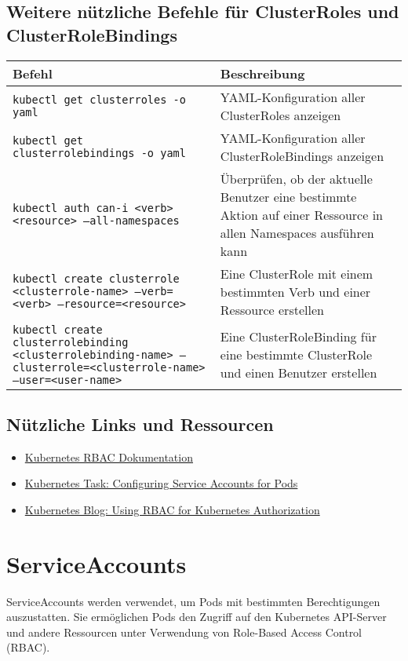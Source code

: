 \subsection{Weitere nützliche Befehle für ClusterRoles und ClusterRoleBindings}
\begin{tabular}{
|p{}|p{}|}
\hline
\textbf{Befehl} & \textbf{Beschreibung} \\
\hline
\texttt{kubectl get clusterroles -o yaml} & YAML-Konfiguration aller ClusterRoles anzeigen \\
\texttt{kubectl get clusterrolebindings -o yaml} & YAML-Konfiguration aller ClusterRoleBindings anzeigen \\
\texttt{kubectl auth can-i <verb> <resource> --all-namespaces} & Überprüfen, ob der aktuelle Benutzer eine bestimmte Aktion auf einer Ressource in allen Namespaces ausführen kann \\
\texttt{kubectl create clusterrole <clusterrole-name> --verb=<verb> --resource=<resource>} & Eine ClusterRole mit einem bestimmten Verb und einer Ressource erstellen \\
\texttt{kubectl create clusterrolebinding <clusterrolebinding-name> --clusterrole=<clusterrole-name> --user=<user-name>} & Eine ClusterRoleBinding für eine bestimmte ClusterRole und einen Benutzer erstellen \\
\hline
\end{tabular}

\subsection*{Nützliche Links und Ressourcen}
\begin{itemize}
    \item \href{https://kubernetes.io/docs/reference/access-authn-authz/rbac/}{Kubernetes RBAC Dokumentation}
    \item \href{https://kubernetes.io/docs/tasks/configure-pod-container/configure-service-account/}{Kubernetes Task: Configuring Service Accounts for Pods}
    \item \href{https://kubernetes.io/blog/2017/10/using-rbac-generally-available-18/}{Kubernetes Blog: Using RBAC for Kubernetes Authorization}
\end{itemize}

\section{ServiceAccounts}
ServiceAccounts werden verwendet, um Pods mit bestimmten Berechtigungen auszustatten. Sie ermöglichen Pods den Zugriff auf den Kubernetes API-Server und andere Ressourcen unter Verwendung von Role-Based Access Control (RBAC).\\

